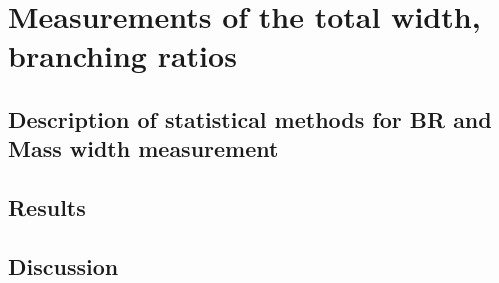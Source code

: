 \section{Measurements of the total width, branching ratios}
\label{subsec:widthbr}

\subsection{Description of statistical methods for BR and Mass width measurement}
\subsection{Results}
\subsection{Discussion}
